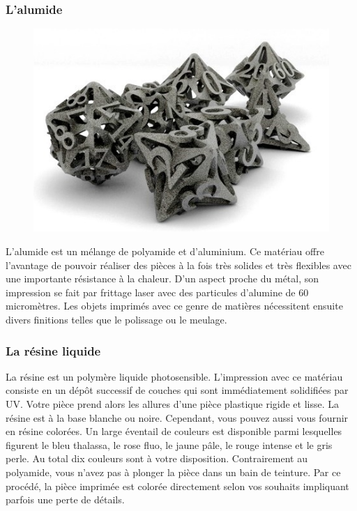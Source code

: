 \documentclass{article}
\begin{document}
\subsubsection{L'alumide}
\begin{figure}[h!]
\centering
\includegraphics[scale=0.4]{./images/alumide.png}
\end{figure}\hfill
 \par\leavevmode\par
L'alumide est un mélange de polyamide et d'aluminium. Ce matériau offre l'avantage de pouvoir réaliser des pièces à la fois très solides et très flexibles avec une importante résistance à la chaleur. D'un aspect proche du métal, son impression se fait par frittage laser avec des particules d'alumine de 60 micromètres. Les objets imprimés avec ce genre de matières nécessitent ensuite divers finitions telles que le polissage ou le meulage.\hfill

\subsubsection{La résine liquide}
La résine est un polymère liquide photosensible. L'impression avec ce matériau consiste en un dépôt successif de couches qui sont immédiatement solidifiées par UV. Votre pièce prend alors les allures d'une pièce plastique rigide et lisse. La résine est à la base blanche ou noire. Cependant, vous pouvez aussi vous fournir en résine colorées. Un large éventail de couleurs est disponible parmi lesquelles figurent le bleu thalassa, le rose fluo, le jaune pâle, le rouge intense et le gris perle. Au total dix couleurs sont à votre disposition. Contrairement au polyamide, vous n'avez pas à plonger la pièce dans un bain de teinture. Par ce procédé, la pièce imprimée est colorée directement selon vos souhaits impliquant parfois une perte de détails. \hfill
 \par\leavevmode\par
{}
\end{document}
